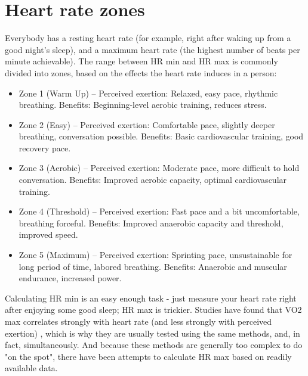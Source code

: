\section{Heart rate zones}

Everybody has a resting heart rate (for example, right after waking up from a good night's sleep), and a maximum heart rate (the highest number of beats per minute achievable).
The range between HR min and HR max is commonly divided into zones, based on the effects the heart rate induces in a person:
\begin{itemize}
    \item Zone 1 (Warm Up) --
    Perceived exertion: Relaxed, easy pace, rhythmic breathing.
    Benefits: Beginning-level aerobic training, reduces stress.
    \item Zone 2 (Easy) --
    Perceived exertion: Comfortable pace, slightly deeper breathing, conversation possible.
    Benefits: Basic cardiovascular training, good recovery pace.
    \item Zone 3 (Aerobic) --
    Perceived exertion: Moderate pace, more difficult to hold conversation.
    Benefits: Improved aerobic capacity, optimal cardiovascular training.
    \item Zone 4 (Threshold) --
    Perceived exertion: Fast pace and a bit uncomfortable, breathing forceful.
    Benefits: Improved anaerobic capacity and threshold, improved speed.
    \item Zone 5 (Maximum) --
    Perceived exertion: Sprinting pace, unsustainable for long period of time, labored breathing.
    Benefits: Anaerobic and muscular endurance, increased power.\cite{garmin-heart-zones}
\end{itemize}

Calculating HR min is an easy enough task - just measure your heart rate right after enjoying some good sleep; HR max is trickier.
Studies have found that VO2 max correlates strongly with heart rate (and less strongly with perceived exertion) \cite{vo2-max-hr-correlation}, which is why they are usually tested using the same methods, and, in fact, simultaneously.
And because these methods are generally too complex to do "on the spot", there have been attempts to calculate HR max based on readily available data.

